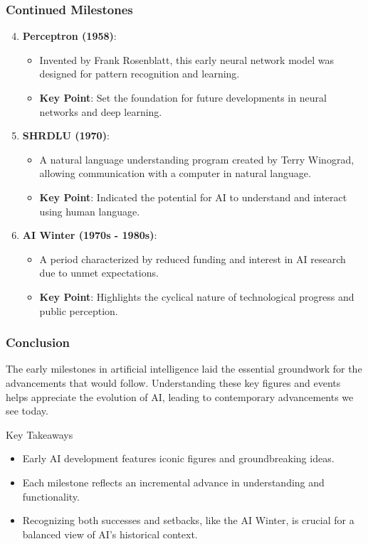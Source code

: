 \documentclass{beamer}
\begin{document}
\begin{frame}[fragile]
    \frametitle{Continued Milestones}
    \begin{enumerate}
        \setcounter{enumi}{3}
        
        \item \textbf{Perceptron (1958)}:
        \begin{itemize}
            \item Invented by Frank Rosenblatt, this early neural network model was designed for pattern recognition and learning.
            \item \textbf{Key Point}: Set the foundation for future developments in neural networks and deep learning.
        \end{itemize}
        
        \item \textbf{SHRDLU (1970)}:
        \begin{itemize}
            \item A natural language understanding program created by Terry Winograd, allowing communication with a computer in natural language.
            \item \textbf{Key Point}: Indicated the potential for AI to understand and interact using human language.
        \end{itemize}
        
        \item \textbf{AI Winter (1970s - 1980s)}:
        \begin{itemize}
            \item A period characterized by reduced funding and interest in AI research due to unmet expectations.
            \item \textbf{Key Point}: Highlights the cyclical nature of technological progress and public perception.
        \end{itemize}
    \end{enumerate}
\end{frame}

\begin{frame}[fragile]
    \frametitle{Conclusion}
    The early milestones in artificial intelligence laid the essential groundwork for the advancements that would follow. Understanding these key figures and events helps appreciate the evolution of AI, leading to contemporary advancements we see today.
    
    \begin{block}{Key Takeaways}
        \begin{itemize}
            \item Early AI development features iconic figures and groundbreaking ideas.
            \item Each milestone reflects an incremental advance in understanding and functionality.
            \item Recognizing both successes and setbacks, like the AI Winter, is crucial for a balanced view of AI's historical context.
        \end{itemize}
    \end{block}
\end{frame}
\end{document}
